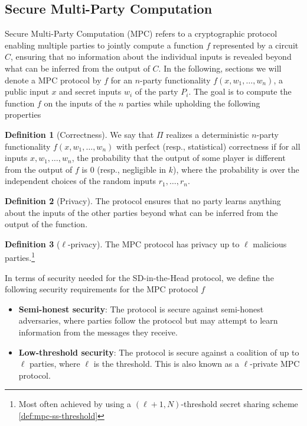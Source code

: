 \documentclass[11pt]{report}
\theoremstyle{definition}
\newtheorem{definition}{Definition}[section]
\theoremstyle{plain}
\begin{document}
\subsection{Secure Multi-Party Computation}\label{sec:mpc}

Secure Multi-Party Computation (MPC) refers to a cryptographic protocol enabling multiple parties to jointly compute a function $f$ represented by a circuit $C$, ensuring that no information about the individual inputs is revealed beyond what can be inferred from the output of $C$. In the following, sections we will denote a MPC protocol by $f$ for an $n$-party functionality $f(x, w_1, \dots, w_n)$, a public input $x$ and secret inputs $w_i$ of the party $P_i$. The goal is to compute the function $f$ on the inputs of the $n$ parties while upholding the following properties~\cite{cramer2015secure}

\begin{definition}[Correctness]\label{def:mpc-correctness}
  We say that $\Pi$ realizes a deterministic $n$-party functionality $f(x, w_1, \dots, w_n)$ with perfect (resp., statistical) correctness if for all inputs $x, w_1, \dots, w_n$, the probability that the output of some player is different from the output of $f$ is $0$ (resp., negligible in $k$), where the probability is over the independent choices of the random inputs $r_1, \dots, r_n$.
\end{definition}

\begin{definition}[Privacy]\label{def:mpc-privacy}
  The protocol ensures that no party learns anything about the inputs of the other parties beyond what can be inferred from the output of the function.
\end{definition}

\begin{definition}[$\ell$-privacy]\label{def:mpc-ell-privacy}
  The MPC protocol has privacy up to $\ell$ malicious parties.\footnote{Most often achieved by using a $(\ell + 1, N)$-threshold secret sharing scheme \autoref{def:mpc-ss-threshold}}
\end{definition}

In terms of security needed for the SD-in-the-Head protocol, we define the following security requirements for the MPC protocol $f$

\begin{itemize}
  \item \textbf{Semi-honest security}: The protocol is secure against semi-honest adversaries, where parties follow the protocol but may attempt to learn information from the messages they receive.
  \item \textbf{Low-threshold security}: The protocol is secure against a coalition of up to $\ell$ parties, where $\ell$ is the threshold. This is also known as a $\ell$-private MPC protocol.
\end{itemize}
\end{document}
